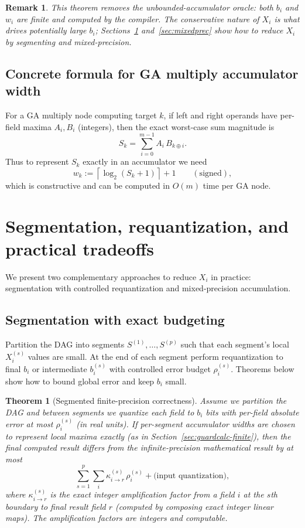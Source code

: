 \documentclass[11pt]{article}
\theoremstyle{definition}
\theoremstyle{plain}
\newtheorem{theorem}{Theorem}[section]
\newtheorem{remark}{Remark}[section]
\begin{document}
\begin{remark}
This theorem removes the unbounded-accumulator oracle: both $b_i$ and $w_i$ are finite and computed by the compiler.  The conservative nature of $X_i$ is what drives potentially large $b_i$; Sections~\ref{sec:segmented-finite} and~\ref{sec:mixedprec} show how to reduce $X_i$ by segmenting and mixed-precision.
\end{remark}

\subsection{Concrete formula for GA multiply accumulator width}
For a GA multiply node computing target $k$, if left and right operands have per-field maxima $A_i, B_i$ (integers), then the exact worst-case sum magnitude is
\begin{equation}\label{eq:GA-sum-bound}
S_k = \sum_{i=0}^{m-1} A_i\, B_{k\oplus i}.
\end{equation}
Thus to represent $S_k$ exactly in an accumulator we need
$$
w_k := \left\lceil \log_2\left( S_k + 1 \right) \right\rceil + 1 \qquad(\text{signed}),
$$
which is constructive and can be computed in $O(m)$ time per GA node.

\section{Segmentation, requantization, and practical tradeoffs}
\label{sec:segmented-finite}
We present two complementary approaches to reduce $X_i$ in practice: segmentation with controlled requantization and mixed-precision accumulation.

\subsection{Segmentation with exact budgeting}
Partition the DAG into segments $S^{(1)},\dots,S^{(p)}$ such that each segment's local $X^{(s)}_i$ values are small. At the end of each segment perform requantization to final $b_i$ or intermediate $b^{(s)}_i$ with controlled error budget $\rho^{(s)}_i$.  Theorems below show how to bound global error and keep $b_i$ small.

\begin{theorem}[Segmented finite-precision correctness]
\label{thm:segmented-finite}
Assume we partition the DAG and between segments we quantize each field to $b_i$ bits with per-field absolute error at most $\rho^{(s)}_i$ (in real units). If per-segment accumulator widths are chosen to represent local maxima exactly (as in Section~\ref{sec:guardcalc-finite}), then the final computed result differs from the infinite-precision mathematical result by at most
$$
\sum_{s=1}^p \sum_{i} \kappa^{(s)}_{i\to r}\, \rho^{(s)}_i + \text{(input quantization)},
$$
where $\kappa^{(s)}_{i\to r}$ is the exact integer amplification factor from a field $i$ at the $s$th boundary to final result field $r$ (computed by composing exact integer linear maps).  The amplification factors are integers and computable.
\end{theorem}
\end{document}
